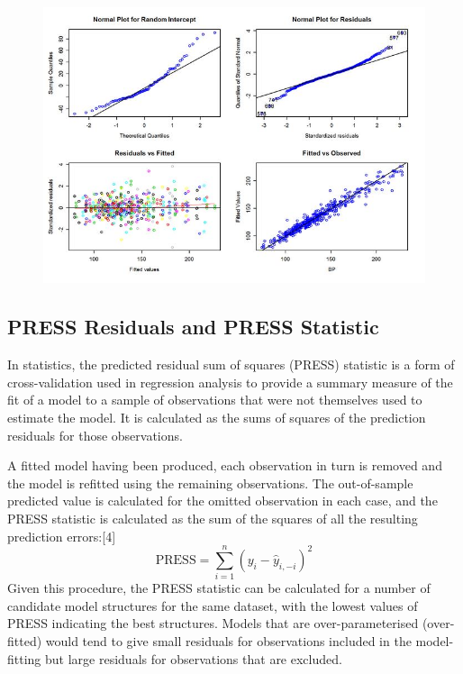 \documentclass[Main.tex]{subfiles}
\begin{document}
\begin{figure}[h!]
\centering
\includegraphics[width=0.9\linewidth]{images/ResidPlot}
\caption{}
\label{fig:ResidPlot}
\end{figure}


\subsection{PRESS Residuals and PRESS Statistic}
In statistics, the predicted residual sum of squares (PRESS) statistic is a form of cross-validation used in regression analysis to provide a summary measure of the fit of a model to a sample of observations that were not themselves used to estimate the model. It is calculated as the sums of squares of the prediction residuals for those observations.

A fitted model having been produced, each observation in turn is removed and the model is refitted using the remaining observations. The out-of-sample predicted value is calculated for the omitted observation in each case, and the PRESS statistic is calculated as the sum of the squares of all the resulting prediction errors:[4]
\[\mbox{PRESS} =\sum_{i=1}^n (y_i - \hat{y}_{i, -i})^2 \]
Given this procedure, the PRESS statistic can be calculated for a number of candidate model structures for the same dataset, with the lowest values of PRESS indicating the best structures. Models that are over-parameterised (over-fitted) would tend to give small residuals for observations included in the model-fitting but large residuals for observations that are excluded.
\end{document}
